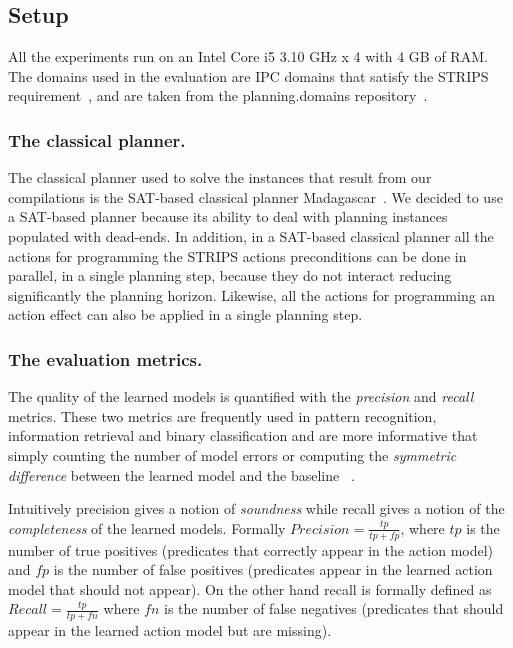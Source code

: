 \documentclass[letterpaper]{article} %
\begin{document}
\subsection{Setup}
All the experiments run on an Intel Core i5 3.10 GHz x 4 with 4 GB of RAM. The domains used in the evaluation are IPC domains that satisfy the STRIPS requirement~\cite{fox2003pddl2}, and are taken from the {\sc planning.domains} repository~\cite{muise2016planning}.

\subsubsection{The classical planner.}
The classical planner used to solve the instances that result from our compilations is the SAT-based classical planner {\sc Madagascar}~\cite{rintanen2014madagascar}. We decided to use a SAT-based planner because its ability to deal with planning instances populated with dead-ends. In addition, in a SAT-based classical planner all the actions for programming the STRIPS actions preconditions can be done in parallel, in a single planning step, because they do not interact reducing significantly the planning horizon. Likewise, all the actions for programming an action effect can also be applied in a single planning step.  


\subsubsection{The evaluation metrics.}
The quality of the learned models is quantified with the {\em precision} and {\em recall} metrics. These two metrics are frequently used in pattern recognition, information retrieval and binary classification and are more informative that simply counting the number of model errors or computing the {\em symmetric difference} between the learned model and the baseline ~\cite{davis2006relationship}.

Intuitively precision gives a notion of {\em soundness} while recall gives a notion of the {\em completeness} of the learned models. Formally $Precision=\frac{tp}{tp+fp}$, where $tp$ is the number of true positives (predicates that correctly appear in the action model) and $fp$ is the number of false positives (predicates appear in the learned action model that should not appear). On the other hand recall is formally defined as $Recall=\frac{tp}{tp+fn}$ where $fn$ is the number of false negatives (predicates that should appear in the learned action model but are missing). 
\end{document}
